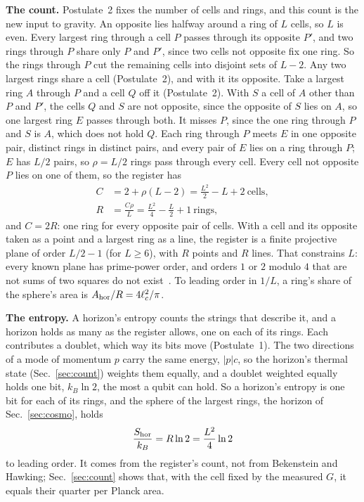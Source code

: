 \documentclass[aps,prd,twocolumn,superscriptaddress,nofootinbib,showkeys]{revtex4-2}
\newcommand{\lc}{\ell_c}
\begin{document}
\textbf{The count.} Postulate~2 fixes the number of cells and rings, and this count is the new input to gravity. An opposite lies halfway around a ring of $L$ cells, so $L$ is even. Every largest ring through a cell $P$ passes through its opposite $P'$, and two rings through $P$ share only $P$ and $P'$, since two cells not opposite fix one ring. So the rings through $P$ cut the remaining cells into disjoint sets of $L-2$. Any two largest rings share a cell (Postulate~2), and with it its opposite. Take a largest ring $A$ through $P$ and a cell $Q$ off it (Postulate~2). With $S$ a cell of $A$ other than $P$ and $P'$, the cells $Q$ and $S$ are not opposite, since the opposite of $S$ lies on $A$, so one largest ring $E$ passes through both. It misses $P$, since the one ring through $P$ and $S$ is $A$, which does not hold $Q$. Each ring through $P$ meets $E$ in one opposite pair, distinct rings in distinct pairs, and every pair of $E$ lies on a ring through $P$; $E$ has $L/2$ pairs, so $\rho = L/2$ rings pass through every cell. Every cell not opposite $P$ lies on one of them, so the register has
\begin{equation}
\begin{split}
C &= 2 + \rho(L-2) = \frac{L^2}{2} - L + 2 \ \text{cells},\\
R &= \frac{C\rho}{L} = \frac{L^2}{4} - \frac{L}{2} + 1 \ \text{rings},
\end{split}
\label{eq:counts}
\end{equation}
and $C = 2R$: one ring for every opposite pair of cells. With a cell and its opposite taken as a point and a largest ring as a line, the register is a finite projective plane of order $L/2 - 1$ (for $L\ge6$), with $R$ points and $R$ lines. That constrains $L$: every known plane has prime-power order, and orders $1$ or $2$ modulo $4$ that are not sums of two squares do not exist~\cite{bruck1949}. To leading order in $1/L$, a ring's share of the sphere's area is $A_{\rm hor}/R = 4\lc^2/\pi$.

\textbf{The entropy.} A horizon's entropy counts the strings that describe it, and a horizon holds as many as the register allows, one on each of its rings. Each contributes a doublet, which way its bits move (Postulate~1). The two directions of a mode of momentum $p$ carry the same energy, $|p|c$, so the horizon's thermal state (Sec.~\ref{sec:count}) weights them equally, and a doublet weighted equally holds one bit, $k_B\ln2$, the most a qubit can hold. So a horizon's entropy is one bit for each of its rings, and the sphere of the largest rings, the horizon of Sec.~\ref{sec:cosmo}, holds
\begin{equation}
\frac{S_{\rm hor}}{k_B} = R\ln2 = \frac{L^2}{4}\ln2
\label{eq:S}
\end{equation}
to leading order. It comes from the register's count, not from Bekenstein and Hawking; Sec.~\ref{sec:count} shows that, with the cell fixed by the measured $G$, it equals their quarter per Planck area.
\end{document}
